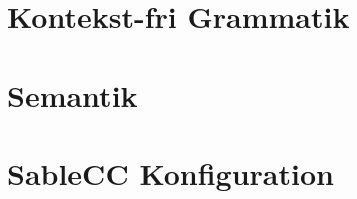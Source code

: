 \appendix


\chapter{Kontekst-fri Grammatik}
\label{bil:cfg}


\label{FIRSTAPPENDIX} %

\chapter{Semantik}
\label{bil:semantik}


\chapter{SableCC Konfiguration}
\label{bil:sablecc}


%


%

%

\label{LASTAPPENDIX}
